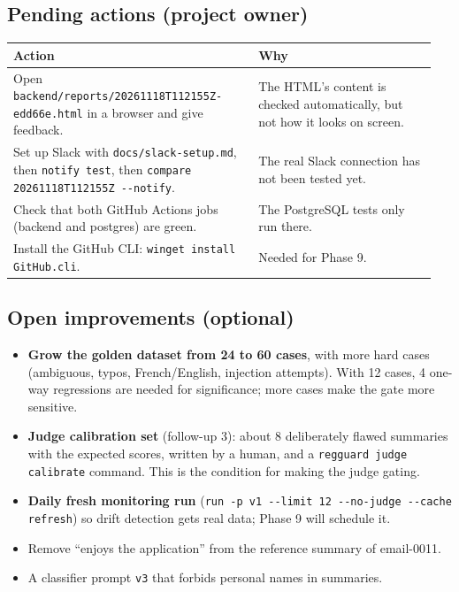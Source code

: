 \documentclass[11pt,a4paper]{article}
\newcommand{\code}[1]{\nolinkurl{#1}}
\begin{document}
\subsection{Pending actions (project owner)}

\begin{longtable}{@{}p{0.55\linewidth}p{0.40\linewidth}@{}}
\toprule
\textbf{Action} & \textbf{Why} \\
\midrule
\endhead
Open \code{backend/reports/20261118T112155Z-edd66e.html} in a browser and give feedback. & The HTML's content is checked automatically, but not how it looks on screen. \\
Set up Slack with \code{docs/slack-setup.md}, then \texttt{notify test}, then \texttt{compare 20261118T112155Z -{}-notify}. & The real Slack connection has not been tested yet. \\
Check that both GitHub Actions jobs (backend and postgres) are green. & The PostgreSQL tests only run there. \\
Install the GitHub CLI: \texttt{winget install GitHub.cli}. & Needed for Phase 9. \\
\bottomrule
\end{longtable}

\subsection{Open improvements (optional)}
\begin{itemize}
  \item \textbf{Grow the golden dataset from 24 to 60 cases}, with more hard cases (ambiguous,
        typos, French/English, injection attempts). With 12 cases, 4 one-way regressions are
        needed for significance; more cases make the gate more sensitive.
  \item \textbf{Judge calibration set} (follow-up 3): about 8 deliberately flawed summaries with
        the expected scores, written by a human, and a \texttt{regguard judge calibrate}
        command. This is the condition for making the judge gating.
  \item \textbf{Daily fresh monitoring run}
        (\texttt{run -p v1 -{}-limit 12 -{}-no-judge -{}-cache refresh}) so drift detection
        gets real data; Phase 9 will schedule it.
  \item Remove ``enjoys the application'' from the reference summary of email-0011.
  \item A classifier prompt \code{v3} that forbids personal names in summaries.
\end{itemize}
\end{document}
